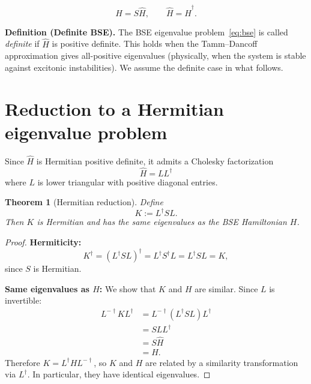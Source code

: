 \documentclass[11pt]{article}
\newtheorem{theorem}{Theorem}
\newcommand{\hc}{\dagger}
\newcommand{\Hhat}{\widehat{H}}
\begin{document}
\begin{equation}
  \boxed{H = S \Hhat, \qquad \Hhat = \Hhat^\hc.}
\end{equation}

\medskip

\noindent\textbf{Definition (Definite BSE).}
The BSE eigenvalue problem~\eqref{eq:bse} is called \emph{definite}
if $\Hhat$ is positive definite.  This holds when the Tamm--Dancoff
approximation gives all-positive eigenvalues (physically, when the
system is stable against excitonic instabilities).  We assume the
definite case in what follows.


\section{Reduction to a Hermitian eigenvalue problem}
\label{sec:hermitian}

Since $\Hhat$ is Hermitian positive definite, it admits a Cholesky
factorization
\begin{equation}\label{eq:cholesky}
  \Hhat = L L^\hc
\end{equation}
where $L$ is lower triangular with positive diagonal entries.

\begin{theorem}[Hermitian reduction]\label{thm:hermitian}
  Define
  \begin{equation}\label{eq:K}
    K := L^\hc S L.
  \end{equation}
  Then $K$ is Hermitian and has the same eigenvalues as the BSE
  Hamiltonian $H$.
\end{theorem}

\begin{proof}
  \textbf{Hermiticity:}
  \[
    K^\hc = (L^\hc S L)^\hc = L^\hc S^\hc L = L^\hc S L = K,
  \]
  since $S$ is Hermitian.

  \textbf{Same eigenvalues as $H$:} We show that $K$ and $H$ are
  similar.  Since $L$ is invertible:
  \begin{align*}
    L^{-\hc} K L^\hc
    &= L^{-\hc} (L^\hc S L) L^\hc \\
    &= S L L^\hc \\
    &= S \Hhat \\
    &= H.
  \end{align*}
  Therefore $K = L^\hc H L^{-\hc}$, so $K$ and $H$ are related by a
  similarity transformation via $L^\hc$.  In particular, they have
  identical eigenvalues.
\end{proof}
\end{document}
